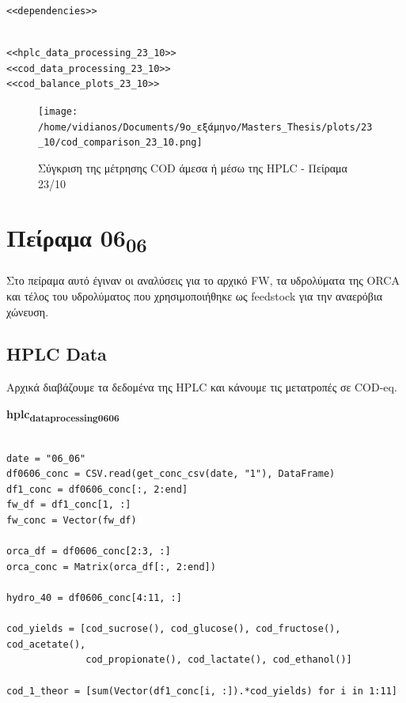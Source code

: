 \documentclass[11pt]{article}
\begin{document}
\begin{verbatim}
<<dependencies>>
\end{verbatim}

\begin{verbatim}

<<hplc_data_processing_23_10>>
<<cod_data_processing_23_10>>
<<cod_balance_plots_23_10>>

\end{verbatim}

\begin{figure}[htbp]
\centering
\texttt{[image: /home/vidianos/Documents/9o\_εξάμηνο/Masters\_Thesis/plots/23\_10/cod\_comparison\_23\_10.png]}
\caption{Σύγκριση της μέτρησης COD άμεσα ή μέσω της HPLC - Πείραμα 23/10}
\end{figure}

\section{Πείραμα 06\textsubscript{06}}
\label{sec:org6326b4b}
Στο πείραμα αυτό έγιναν οι αναλύσεις για το αρχικό FW, τα υδρολύματα της ORCA και τέλος του υδρολύματος που χρησιμοποιήθηκε ως feedstock για την αναερόβια χώνευση.
\subsection{HPLC Data}
\label{sec:orgcd08d27}
Αρχικά διαβάζουμε τα δεδομένα της HPLC και κάνουμε τις μετατροπές σε COD-eq.

\textbf{hplc\textsubscript{data}\textsubscript{processing}\textsubscript{06}\textsubscript{06}}
\begin{verbatim}

date = "06_06"
df0606_conc = CSV.read(get_conc_csv(date, "1"), DataFrame)
df1_conc = df0606_conc[:, 2:end]
fw_df = df1_conc[1, :]
fw_conc = Vector(fw_df)

orca_df = df0606_conc[2:3, :]
orca_conc = Matrix(orca_df[:, 2:end])

hydro_40 = df0606_conc[4:11, :]

cod_yields = [cod_sucrose(), cod_glucose(), cod_fructose(), cod_acetate(),
              cod_propionate(), cod_lactate(), cod_ethanol()]

cod_1_theor = [sum(Vector(df1_conc[i, :]).*cod_yields) for i in 1:11]

\end{verbatim}
\end{document}
